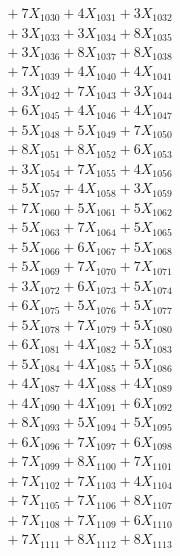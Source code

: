 \documentclass[a4paper,10pt]{article}
\begin{document}
{\begin{align}
&\;  + 7 X_{1030} + 4 X_{1031} + 3 X_{1032} \\[0.3ex]
&\;  + 3 X_{1033} + 3 X_{1034} + 8 X_{1035} \\[0.3ex]
&\;  + 3 X_{1036} + 8 X_{1037} + 8 X_{1038} \\[0.3ex]
&\;  + 7 X_{1039} + 4 X_{1040} + 4 X_{1041} \\[0.3ex]
&\;  + 3 X_{1042} + 7 X_{1043} + 3 X_{1044} \\[0.3ex]
&\;  + 6 X_{1045} + 4 X_{1046} + 4 X_{1047} \\[0.3ex]
&\;  + 5 X_{1048} + 5 X_{1049} + 7 X_{1050} \\[0.3ex]
&\;  + 8 X_{1051} + 8 X_{1052} + 6 X_{1053} \\[0.3ex]
&\;  + 3 X_{1054} + 7 X_{1055} + 4 X_{1056} \\[0.3ex]
&\;  + 5 X_{1057} + 4 X_{1058} + 3 X_{1059} \\[0.5ex]\allowbreak
&\;  + 7 X_{1060} + 5 X_{1061} + 5 X_{1062} \\[0.3ex]
&\;  + 5 X_{1063} + 7 X_{1064} + 5 X_{1065} \\[0.3ex]
&\;  + 5 X_{1066} + 6 X_{1067} + 5 X_{1068} \\[0.3ex]
&\;  + 5 X_{1069} + 7 X_{1070} + 7 X_{1071} \\[0.3ex]
&\;  + 3 X_{1072} + 6 X_{1073} + 5 X_{1074} \\[0.3ex]
&\;  + 6 X_{1075} + 5 X_{1076} + 5 X_{1077} \\[0.3ex]
&\;  + 5 X_{1078} + 7 X_{1079} + 5 X_{1080} \\[0.3ex]
&\;  + 6 X_{1081} + 4 X_{1082} + 5 X_{1083} \\[0.3ex]
&\;  + 5 X_{1084} + 4 X_{1085} + 5 X_{1086} \\[0.3ex]
&\;  + 4 X_{1087} + 4 X_{1088} + 4 X_{1089} \\[0.5ex]\allowbreak
&\;  + 4 X_{1090} + 4 X_{1091} + 6 X_{1092} \\[0.3ex]
&\;  + 8 X_{1093} + 5 X_{1094} + 5 X_{1095} \\[0.3ex]
&\;  + 6 X_{1096} + 7 X_{1097} + 6 X_{1098} \\[0.3ex]
&\;  + 7 X_{1099} + 8 X_{1100} + 7 X_{1101} \\[0.3ex]
&\;  + 7 X_{1102} + 7 X_{1103} + 4 X_{1104} \\[0.3ex]
&\;  + 7 X_{1105} + 7 X_{1106} + 8 X_{1107} \\[0.3ex]
&\;  + 7 X_{1108} + 7 X_{1109} + 6 X_{1110} \\[0.3ex]
&\;  + 7 X_{1111} + 8 X_{1112} + 8 X_{1113} \\[0.3ex]

\end{align}}
\end{document}
